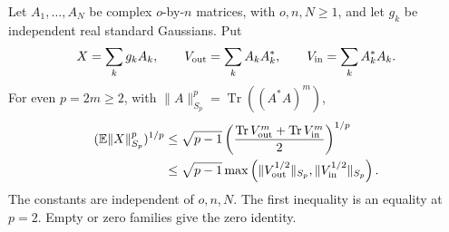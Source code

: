 \begin{proposition}\label{P:finite-gaussian-matrix}
  Let $A_1,\ldots,A_N$ be complex $o$-by-$n$ matrices, with $o,n,N \ge 1$,
  and let $g_k$ be independent real standard Gaussians. Put
  \[
    X=\sum_k g_kA_k,\qquad V_{\rm out}=\sum_k A_kA_k^*,
    \qquad V_{\rm in}=\sum_k A_k^*A_k.
  \]
  For even $p=2m \ge 2$, with $\|A\|_{S_p}^p=\operatorname{Tr}((A^*A)^m)$,
  \begin{align}
    (\mathbb{E}\|X\|_{S_p}^p)^{1/p}
    &\le \sqrt{p-1}\left(
    \frac{\operatorname{Tr}V_{\rm out}^m+
    \operatorname{Tr}V_{\rm in}^m}{2}\right)^{1/p}
    \label{E:finite-gaussian-average}\\
    &\le \sqrt{p-1}\max\left(
    \|V_{\rm out}^{1/2}\|_{S_p},\|V_{\rm in}^{1/2}\|_{S_p}\right).
    \label{E:finite-gaussian-maximum}
  \end{align}
  The constants are independent of $o,n,N$. The first inequality is an
  equality at $p=2$. Empty or zero families give the zero identity.
\end{proposition}

